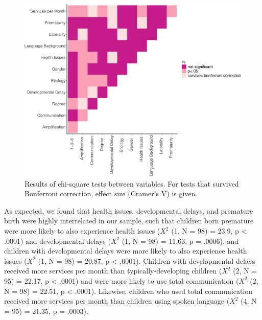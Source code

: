 \documentclass[
  english,
  man]{apa6}
\begin{document}
\begin{figure}
\centering
\includegraphics{ELSSP_paper_files/figure-latex/relationships-plot-1.pdf}
\caption{\label{fig:relationships-plot}Results of chi-square tests between variables. For tests that survived Bonferroni correction, effect size (Cramer's V) is given.}
\end{figure}

As expected, we found that health issues, developmental delays, and premature birth were highly interrelated in our sample, such that children born premature were more likely to also experience health issues (\(X^2\) (1, N = 98) = 23.9, p \textless{} .0001) and developmental delays (\(X^2\) (1, N = 98) = 11.63, p = .0006), and children with developmental delays were more likely to also experience health issues (\(X^2\) (1, N = 98) = 20.87, p \textless{} .0001). Children with developmental delays received more services per month than typically-developing children (\(X^2\) (2, N = 95) = 22.17, p \textless{} .0001) and were more likely to use total communication (\(X^2\) (2, N = 98) = 22.51, p \textless{} .0001). Likewise, children who used total communication received more services per month than children using spoken language (\(X^2\) (4, N = 95) = 21.35, p = .0003).
\end{document}
